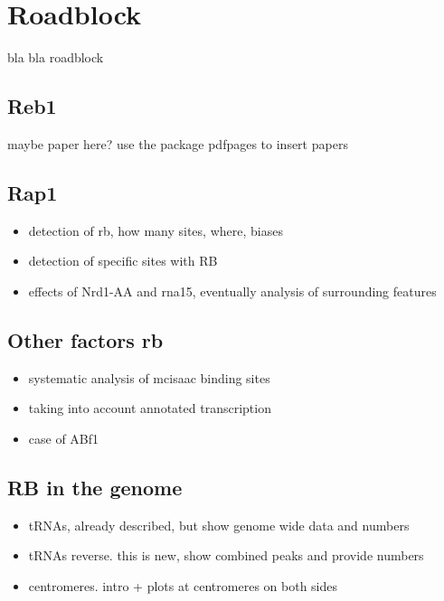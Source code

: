 \chapter{Roadblock}
bla bla roadblock

\section{Reb1}
maybe paper here? 
use the package pdfpages to insert papers
\section{Rap1}

\begin{itemize}
\item detection of rb, how many sites, where, biases
\item detection of specific sites with RB
\item effects of Nrd1-AA and rna15, eventually analysis of surrounding features
\end{itemize}

\section{Other factors rb}

\begin{itemize}
\item systematic analysis of mcisaac binding sites
\item taking into account annotated transcription
\item case of ABf1

\end{itemize}

\section{RB in the genome}

\begin{itemize}
\item tRNAs, already described, but show genome wide data and numbers
\item tRNAs reverse. this is new, show combined peaks and provide numbers
\item centromeres. intro + plots at centromeres on both sides
\end{itemize}


